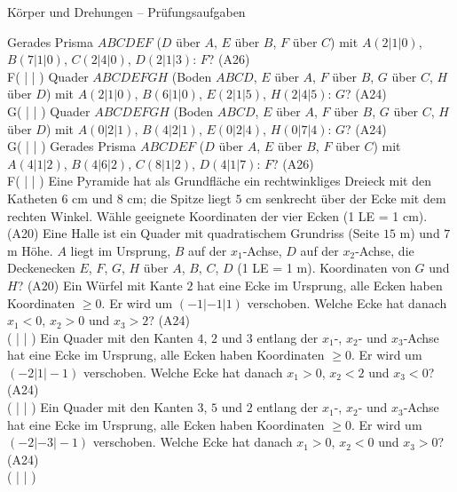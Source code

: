 \begin{aufgabe}{Körper und Drehungen – Prüfungsaufgaben}
\begin{teile}
\teil Gerades Prisma $ABCDEF$ ($D$ über $A$, $E$ über $B$, $F$ über $C$) mit $A(2 | 1 | 0)$, $B(7 | 1 | 0)$, $C(2 | 4 | 0)$, $D(2 | 1 | 3)$: $F$? \hfill (A26) \\ F( \leerfeld | \leerfeld | \leerfeld )
\teil Quader $ABCDEFGH$ (Boden $ABCD$, $E$ über $A$, $F$ über $B$, $G$ über $C$, $H$ über $D$) mit $A(2 | 1 | 0)$, $B(6 | 1 | 0)$, $E(2 | 1 | 5)$, $H(2 | 4 | 5)$: $G$? \hfill (A24) \\ G( \leerfeld | \leerfeld | \leerfeld )
\teil Quader $ABCDEFGH$ (Boden $ABCD$, $E$ über $A$, $F$ über $B$, $G$ über $C$, $H$ über $D$) mit $A(0 | 2 | 1)$, $B(4 | 2 | 1)$, $E(0 | 2 | 4)$, $H(0 | 7 | 4)$: $G$? \hfill (A24) \\ G( \leerfeld | \leerfeld | \leerfeld )
\teil Gerades Prisma $ABCDEF$ ($D$ über $A$, $E$ über $B$, $F$ über $C$) mit $A(4 | 1 | 2)$, $B(4 | 6 | 2)$, $C(8 | 1 | 2)$, $D(4 | 1 | 7)$: $F$? \hfill (A26) \\ F( \leerfeld | \leerfeld | \leerfeld )
\teil Eine Pyramide hat als Grundfläche ein rechtwinkliges Dreieck mit den Katheten $6$ cm und $8$ cm; die Spitze liegt $5$ cm senkrecht über der Ecke mit dem rechten Winkel. Wähle geeignete Koordinaten der vier Ecken (1 LE = 1 cm). \hfill (A20)
\teil Eine Halle ist ein Quader mit quadratischem Grundriss (Seite $15$ m) und $7$ m Höhe. $A$ liegt im Ursprung, $B$ auf der $x_1$-Achse, $D$ auf der $x_2$-Achse, die Deckenecken $E$, $F$, $G$, $H$ über $A$, $B$, $C$, $D$ (1 LE = 1 m). Koordinaten von $G$ und $H$? \hfill (A20)
\teil Ein Würfel mit Kante $2$ hat eine Ecke im Ursprung, alle Ecken haben Koordinaten $\ge 0$. Er wird um $(-1 | -1 | 1)$ verschoben. Welche Ecke hat danach $x_1 < 0$, $x_2 > 0$ und $x_3 > 2$? \hfill (A24) \\ ( \leerfeld | \leerfeld | \leerfeld )
\teil Ein Quader mit den Kanten $4$, $2$ und $3$ entlang der $x_1$-, $x_2$- und $x_3$-Achse hat eine Ecke im Ursprung, alle Ecken haben Koordinaten $\ge 0$. Er wird um $(-2 | 1 | -1)$ verschoben. Welche Ecke hat danach $x_1 > 0$, $x_2 < 2$ und $x_3 < 0$? \hfill (A24) \\ ( \leerfeld | \leerfeld | \leerfeld )
\teil Ein Quader mit den Kanten $3$, $5$ und $2$ entlang der $x_1$-, $x_2$- und $x_3$-Achse hat eine Ecke im Ursprung, alle Ecken haben Koordinaten $\ge 0$. Er wird um $(-2 | -3 | -1)$ verschoben. Welche Ecke hat danach $x_1 > 0$, $x_2 < 0$ und $x_3 > 0$? \hfill (A24) \\ ( \leerfeld | \leerfeld | \leerfeld )

\end{teile}
\end{aufgabe}

